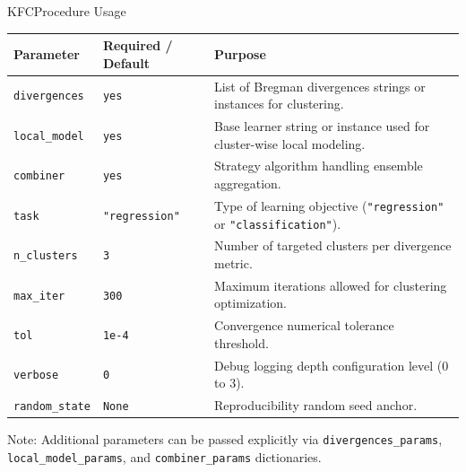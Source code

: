 \begin{frame}[fragile, t]{KFCProcedure Usage}
    \vspace{-0.5cm}
    \begin{table}
        \scriptsize
        \renewcommand{\arraystretch}{1.2}
        \setlength{\tabcolsep}{1.8pt}
        \begin{tabularx}{\textwidth}{
                >{\raggedright\arraybackslash}m{2.55cm}
                >{\raggedright\arraybackslash}m{2.55cm}
                >{\raggedright\arraybackslash}X}
            \toprule
            \textbf{Parameter}          &
            \textbf{Required / Default} &
            \textbf{Purpose}                                                                 \\
            \midrule
            \texttt{divergences}        &
            \texttt{yes}                &
            List of Bregman divergences strings or instances for clustering.                 \\
            \texttt{local\_model}       &
            \texttt{yes}                &
            Base learner string or instance used for cluster-wise local modeling.            \\
            \texttt{combiner}           &
            \texttt{yes}                &
            Strategy algorithm handling ensemble aggregation.                                \\
            \texttt{task}               &
            \texttt{"regression"}       &
            Type of learning objective (\texttt{"regression"} or \texttt{"classification"}). \\
            \texttt{n\_clusters}        &
            \texttt{3}                  &
            Number of targeted clusters per divergence metric.                               \\
            \texttt{max\_iter}          &
            \texttt{300}                &
            Maximum iterations allowed for clustering optimization.                          \\
            \texttt{tol}                &
            \texttt{1e-4}               &
            Convergence numerical tolerance threshold.                                       \\
            \texttt{verbose}            &
            \texttt{0}                  &
            Debug logging depth configuration level (0 to 3).                                \\
            \texttt{random\_state}      &
            \texttt{None}               &
            Reproducibility random seed anchor.                                              \\
            \bottomrule
        \end{tabularx}
    \end{table}
    \tiny *Note: Additional parameters can be passed explicitly via \texttt{divergences\_params}, \texttt{local\_model\_params}, and \texttt{combiner\_params} dictionaries.
\end{frame}

